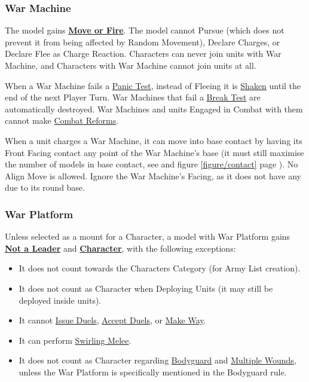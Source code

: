 \subsubsection{War Machine}
\label{war_machine}

The model gains \hyperref[move_or_fire]{\textbf{Move or Fire}}. The model cannot Pursue (which does not prevent it from being affected by Random Movement), Declare Charges, or Declare Flee as Charge Reaction. Characters can never join units with War Machine, and Characters with War Machine cannot join units at all.

When a War Machine fails a \hyperref[panic_test]{Panic Test}, instead of Fleeing it is \hyperref[shaken]{Shaken} until the end of the next Player Turn. War Machines that fail a \hyperref[break_test]{Break Test} are automatically destroyed. War Machines and units Engaged in Combat with them cannot make \hyperref[combat_reform]{Combat Reforms}.

When a unit charges a War Machine, it can move into base contact by having its Front Facing contact any point of the War Machine's base (it must still maximise the number of models in base contact, see  and figure \ref{figure/contact} page \pageref{figure/contact}). No Align Move is allowed. Ignore the War Machine's Facing, as it does not have any due to its round base.

\newpage
\subsubsection{War Platform}
\label{war_platform}

Unless selected as a mount for a Character, a model with War Platform gains \hyperref[not_a_leader]{\textbf{Not a Leader}} and \hyperref[characters]{\textbf{Character}}, with the following exceptions:

\begin{itemize}[label={-}]
\item It does not count towards the Characters Category (for Army List creation).
\item It does not count as Character when Deploying Units (it may still be deployed inside units).
\item It cannot \hyperref[issuing_a_duel]{Issue Duels}, \hyperref[accepting_and_refusing_a_duel]{Accept Duels}, or \hyperref[make_way]{Make Way}.
\item It can perform \hyperref[swirling_melee]{Swirling Melee}.
\item It does not count as Character regarding \hyperref[bodyguard]{Bodyguard} and \hyperref[multiple_wounds]{Multiple Wounds}, unless the War Platform is specifically mentioned in the Bodyguard rule.
  \end{itemize}
  
